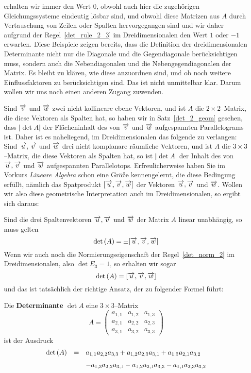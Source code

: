 erhalten wir immer den Wert $0$, obwohl auch hier die zugehörigen Gleichungssysteme eindeutig lösbar sind, 
und obwohl diese Matrizen aus $A$ durch Vertauschung von Zeilen oder Spalten hervorgegangen sind und wir daher 
aufgrund der Regel~\ref{det_rule_2_3} im Dreidimensionalen den Wert $1$ oder $-1$ erwarten. Diese Beispiele 
zeigen bereits, dass die Definition der  dreidimensionalen Determinante nicht nur die Diagonale und die 
Gegendiagonale berücksichtigen muss, sondern auch die Nebendiagonalen und die Nebengegendiagonalen der Matrix. 
Es bleibt zu klären, wie diese anzuordnen sind, und ob noch weitere Einflussfaktoren zu berücksichtigen 
sind. Das ist nicht unmittelbar klar. Darum wollen wir uns noch einen anderen Zugang zuwenden. 

Sind $\overrightarrow{v}$ und $\overrightarrow{w}$ zwei nicht kollineare ebene Vektoren, und ist $A$ die 
$2 \times 2$--Matrix, die diese Vektoren als Spalten hat, so haben wir in 
Satz~\ref{det_2_geom} gesehen, dass $\vert \det{A} \vert$ der Flächeninhalt des von 
$\overrightarrow{v}$ und $\overrightarrow{w}$ aufgespannten Parallelograms ist. Daher ist es naheliegend, 
im Dreidimensionalen das folgende zu verlangen: Sind $\overrightarrow{u}, \overrightarrow{v}$ und 
$\overrightarrow{w}$ drei nicht komplanare räumliche Vektoren, und ist $A$ die $3 \times 3$--Matrix, die 
diese Vektoren als Spalten hat, so ist $\vert \det{A} \vert$ der Inhalt des von $\overrightarrow{u}, 
\overrightarrow{v}$ und $\overrightarrow{w}$ aufgespannten Parallelotops. Erfreulicherweise haben 
Sie im Vorkurs \textit{Lineare Algebra} %
schon eine Größe kennengelernt, die diese Bedingung erfüllt, nämlich 
das Spatprodukt $[\overrightarrow{u}, \overrightarrow{v}, \overrightarrow{w} ]$ der Vektoren 
$\overrightarrow{u}, \overrightarrow{v}$ und $\overrightarrow{w}$. Wollen wir also diese geometrische 
Interpretation auch im Dreidimensionalen, so ergibt sich daraus: 

Sind die drei Spaltenvektoren $\overrightarrow{u}, \overrightarrow{v}$ und $\overrightarrow{w}$ der Matrix 
$A$ linear unabhängig, so muss gelten
  	$$ \det{A} = \pm [\vektor{u}, \vektor{v}, \vektor{w}] $$
Wenn wir auch noch die Normierungseigenschaft der Regel~\ref{det_norm_2} im Dreidimensionalen, also 
$\det{E_3} = 1$, so erhalten wir sogar
  	$$ \det{A} = [\vektor{u}, \vektor{v}, \vektor{w}] $$
und das ist tatsächlich der richtige Ansatz, der zu folgender Formel führt:

\begin{definition} Die \textbf{Determinante} $\det{A}$ eine 
$3 \times 3$--Matrix 
  	$$A = \left( \begin{matrix} a_{1,1} & a_{1,2} & a_{1,3} \\ 
	a_{2,1} & a_{2,2} & a_{2,3} \\ a_{3,1} & a_{3,2} & a_{3,3}
\end{matrix} \right) $$ 
ist der Ausdruck
  	$$ \begin{array}{l c l }
    	 \det{A} & = & a_{1,1} a_{2,2} a_{3,3} + a_{1,2} a_{2,3} a_{3,1} + a_{1,3} a_{2,1} a_{3,2} \\
     	& &  - a_{1,3} a_{2,2} a_{3,1} - a_{1,2} a_{2,1} a_{3,3} - a_{1,1} a_{2,3} a_{3,2} 
  	\end{array} $$
\end{definition}

